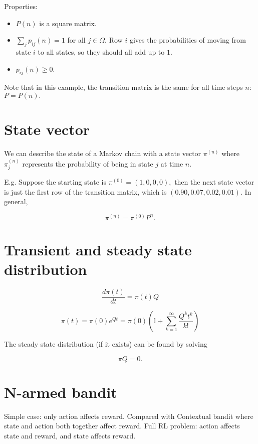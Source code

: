 \documentclass[12pt]{article}
\theoremstyle{plain}
\theoremstyle{definition}
\theoremstyle{remark}
\begin{document}
Properties:

\begin{itemize}
\item \( P(n) \) is a square matrix.
\item \( \sum_{j} p_{ij} (n) = 1 \) for all \( j \in \Omega. \) Row \( i \) gives the probabilities of moving from state \( i \) to all states, so they should all add up to \( 1. \)
\item \( p_{ij}(n) \geq 0. \)
\end{itemize}


Note that in this example, the transition matrix is the same for all time steps \( n: \) \( P = P(n). \)

\section{State vector}


We can describe the state of a Markov chain with a state vector \( \pi^{(n)} \) where \( \pi^{(n)}_{j} \) represents the probability of being in state \( j \) at time \( n. \)

E.g. Suppose the starting state is \( \pi ^ { ( 0 ) } = ( 1,0,0,0 ), \) then the next state vector is just the first row of the transition matrix, which is \( (0.90, 0.07, 0.02, 0.01). \) In general,

\[
\pi ^ { ( n ) } = \pi ^ { ( 0 ) } P ^ { n }.
\]

\section{Transient and steady state distribution}


\[
\frac { d \pi ( t ) } { d t } = \pi ( t ) Q
\]

\[
\pi ( t ) = \pi ( 0 ) e ^ { Q t } = \pi ( 0 ) \left( \mathbb { I } + \sum _ { k = 1 } ^ { \infty } \frac { Q ^ { k } t ^ { k } } { k ! } \right)
\]

The steady state distribution (if it exists) can be found by solving

\[
\pi Q = 0.
\]


\section{N-armed bandit}


Simple case: only action affects reward. Compared with Contextual bandit where
state and action both together affect reward. Full RL problem: action affects
state and reward, and state affects reward.
\end{document}
